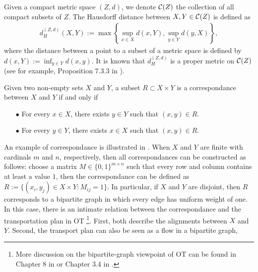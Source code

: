 Given a compact metric space $(Z, d)$, we denote $\mathcal C(Z)$ the collection of all compact subsets of
$Z$. The Hausdorff distance between $X, Y \in \mathcal C(Z)$ is defined as
\begin{align}
    d_{H}^{(Z, d)}(X,Y) := \max \left\{ \sup_{x \in X} d(x,Y), \sup_{y \in Y} d(y,X) \right\},
\end{align}
where the distance between a point to a subset of a metric space is defined by
$d(x,Y) := \inf_{y \in Y} d(x,y)$.
It is known that $d_{H}^{(Z, d)}$ is a proper metric on $\mathcal C(Z)$ (see for example,
Proposition 7.3.3 in \citep{Burago01}).
\begin{definition}[Correspondance]
Given two non-empty sets $X$ and $Y$,
a subset $R \subset X \times Y$ is a correspondance between $X$ and $Y$ if and only if
\begin{itemize}
    \item[$\bullet$] For every $x \in X$, there exists $y \in Y$ such that $(x,y) \in R$.
    \item[$\bullet$] For every $y \in Y$, there exists $x \in X$ such that $(x,y) \in R$.
\end{itemize}
\end{definition}
An example of correspondance is illustrated in .
When $X$ and $Y$ are finite with cardinals $m$ and $n$, respectively,
then all correspondances can be constructed as follows:
choose a matrix $M \in \{0,1 \}^{m \times n}$ such that every row and column
contains at least a value $1$, then the correspondance can be defined as
$R:= \{(x_i, y_j) \in X \times Y: M_{ij} = 1 \}$. In particular, if $X$ and $Y$ are disjoint,
then $R$ corresponds to a bipartite graph in which every edge has uniform weight of one.
In this case, there is an intimate relation between the correspondance
and the transportation plan in OT
\footnote{More discussion on the bipartite-graph viewpoint of OT can be found in
Chapter 8 in \citep{Brualdi06} or Chapter 3.4 in \citep{Peyre19}.}.
First, both describe the alignments between $X$ and $Y$.
Second, the transport plan can also be seen as a flow in a bipartite graph,
